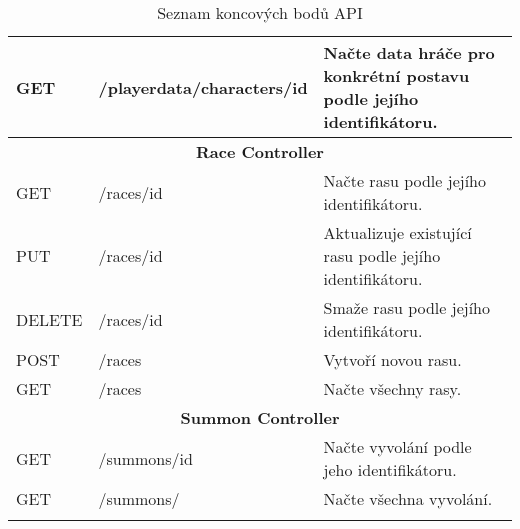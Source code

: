 \begin{longtable}{|l|l|p{}|}
    GET             & /playerdata/characters/{id} & Načte data hráče pro konkrétní postavu podle jejího identifikátoru. \\
    \hline
    \multicolumn{3}{|c|}{\textbf{Race Controller}}                                                                      \\
    \hline
    GET             & /races/{id}                 & Načte rasu podle jejího identifikátoru.                             \\
    PUT             & /races/{id}                 & Aktualizuje existující rasu podle jejího identifikátoru.            \\
    DELETE          & /races/{id}                 & Smaže rasu podle jejího identifikátoru.                             \\
    POST            & /races                      & Vytvoří novou rasu.                                                 \\
    GET             & /races                      & Načte všechny rasy.                                                 \\
    \hline
    \multicolumn{3}{|c|}{\textbf{Summon Controller}}                                                                    \\
    \hline
    GET             & /summons/{id}               & Načte vyvolání podle jeho identifikátoru.                           \\
    GET             & /summons/                   & Načte všechna vyvolání.                                             \\
    \hline
    \caption{Seznam koncových bodů API}
    \label{tab:endpoints}
\end{longtable}